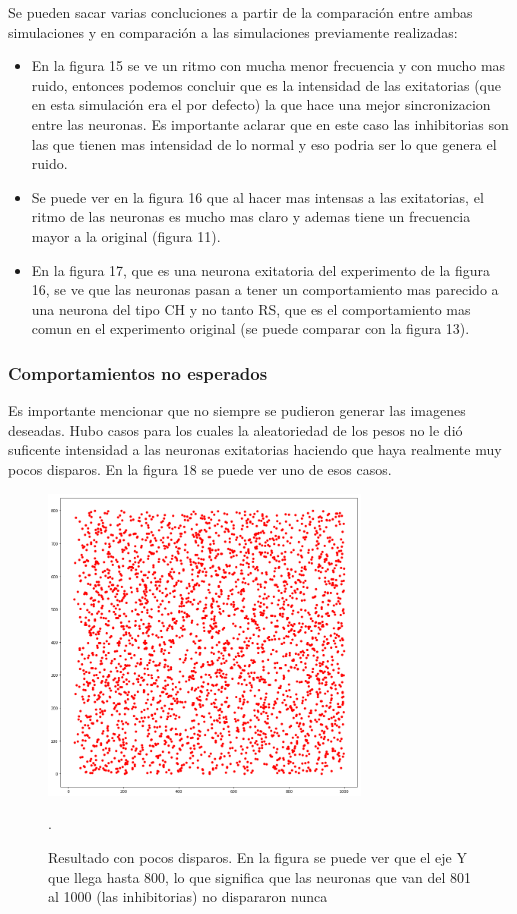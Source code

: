 \documentclass[12pt]{article}
\begin{document}
Se pueden sacar varias concluciones a partir de la comparación entre ambas simulaciones y en comparación a las simulaciones previamente realizadas:
\begin{itemize}
    \item En la figura 15 se ve un ritmo con mucha menor frecuencia y con mucho mas ruido, entonces podemos concluir que es la intensidad de las exitatorias (que en esta simulación era el por defecto)
    la que hace una mejor sincronizacion entre las neuronas. Es importante aclarar que en este caso las inhibitorias son las que tienen mas intensidad de lo normal y eso podria ser lo que genera el ruido.
    \item Se puede ver en la figura 16 que al hacer mas intensas a las exitatorias, el ritmo de las neuronas es mucho mas claro y ademas tiene un frecuencia mayor a la original (figura 11).
    \item En la figura 17, que es una neurona exitatoria del experimento de la figura 16, se ve que las neuronas pasan a tener un comportamiento mas parecido a una neurona del tipo CH y no tanto RS, que es el comportamiento mas comun en el experimento original (se puede comparar con la figura 13).
\end{itemize}

\subsubsection{Comportamientos no esperados}
Es importante mencionar que no siempre se pudieron generar las imagenes deseadas. Hubo casos para los cuales la aleatoriedad de los pesos no le dió suficente intensidad a las neuronas exitatorias haciendo que haya realmente muy pocos disparos.
En la figura 18 se puede ver uno de esos casos.

\begin{figure}[htp!]
    \centering
        \includegraphics[height=8cm]{images/resultadoVacio.png}
    \caption[fontsize=2pt]{Resultado con pocos disparos. En la figura se puede ver que el eje Y que llega hasta 800, lo que significa que las neuronas que van del 801 al 1000 (las inhibitorias) no dispararon nunca}.
\end{figure}
\end{document}
